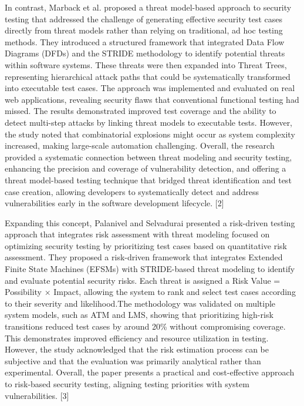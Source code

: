 \documentclass[12pt,a4paper]{report}
\begin{document}
In contrast, Marback et al. proposed a threat model-based approach to security testing that addressed the challenge of generating effective security test cases directly from threat models rather than relying on traditional, ad hoc testing methods. They introduced a structured framework that integrated Data Flow Diagrams (DFDs) and the STRIDE methodology to identify potential threats within software systems. These threats were then expanded into Threat Trees, representing hierarchical attack paths that could be systematically transformed into executable test cases. The approach was implemented and evaluated on real web applications, revealing security flaws that conventional functional testing had missed. The results demonstrated improved test coverage and the ability to detect multi-step attacks by linking threat models to executable tests. However, the study noted that combinatorial explosions might occur as system complexity increased, making large-scale automation challenging. Overall, the research provided a systematic connection between threat modeling and security testing, enhancing the precision and coverage of vulnerability detection, and offering a threat model-based testing technique that bridged threat identification and test case creation, allowing developers to systematically detect and address vulnerabilities early in the software development lifecycle. [2]

Expanding this concept, Palanivel and Selvadurai presented a risk-driven testing approach that integrates risk assessment with threat modeling focused on optimizing security testing by prioritizing test cases based on quantitative risk assessment. They proposed a risk-driven framework that integrates Extended Finite State Machines (EFSMs) with STRIDE-based threat modeling to identify and evaluate potential security risks. Each threat is assigned a Risk Value = Possibility × Impact, allowing the system to rank and select test cases according to their severity and likelihood.The methodology was validated on multiple system models, such as ATM and LMS, showing that prioritizing high-risk transitions reduced test cases by around 20\% without compromising coverage. This demonstrates improved efficiency and resource utilization in testing. However, the study acknowledged that the risk estimation process can be subjective and that the evaluation was primarily analytical rather than experimental. Overall, the paper presents a practical and cost-effective approach to risk-based security testing, aligning testing priorities with system vulnerabilities. [3]
\end{document}
